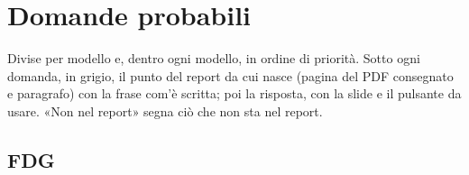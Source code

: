 \documentclass[a4paper,10pt]{article}
\newcommand{\fr}[1]{\getrefnumber{P-#1}}      %
\begin{document}

\section*{Domande probabili}

Divise per modello e, dentro ogni modello, in ordine di priorità. Sotto ogni domanda, in grigio, il punto del report da cui nasce (pagina del PDF consegnato e paragrafo) con la frase com'è scritta; poi la risposta, con la slide e il pulsante da usare. «Non nel report» segna ciò che non sta nel report.

\subsection*{FDG}
\end{document}
